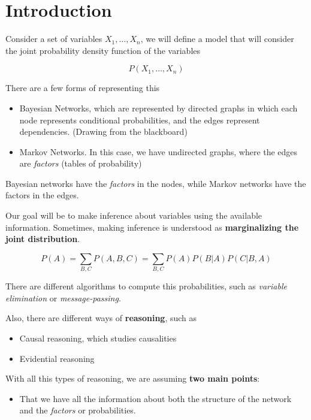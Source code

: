 \hypertarget{introduction}{%
  \section{Introduction}\label{introduction}}

Consider a set of variables \(X_1,\dots,X_n\), we will define a model
that will consider the joint probability density function of the
variables

\[
  P(X_1,\dots,X_n)
\]

There are a few forms of representing this

\begin{itemize}
  \item
        Bayesian Networks, which are represented by directed graphs in which
        each node represents conditional probabilities, and the edges
        represent dependencies. (Drawing from the blackboard)
  \item
        Markov Networks. In this case, we have undirected graphs, where the
        edges are \emph{factors} (tables of probability)
\end{itemize}

Bayesian networks have the \emph{factors} in the nodes, while Markov
networks have the factors in the edges.

Our goal will be to make inference about variables using the available
information. Sometimes, making inference is understood as
\textbf{marginalizing the joint distribution}.

\[
  P(A) = \sum_{B,C} P(A,B,C) = \sum_{B,C}P(A) P(B|A)P(C|B,A)
\]

There are different algorithms to compute this probabilities, such as
\emph{variable elimination} or \emph{message-passing}.

Also, there are different ways of \textbf{reasoning}, such as

\begin{itemize}
  \item
        Causal reasoning, which studies causalities
  \item
        Evidential reasoning
\end{itemize}

With all this types of reasoning, we are assuming \textbf{two main
  points}:

\begin{itemize}
  \item
        That we have all the information about both the structure of the
        network and the \emph{factors} or probabilities.
\end{itemize}

